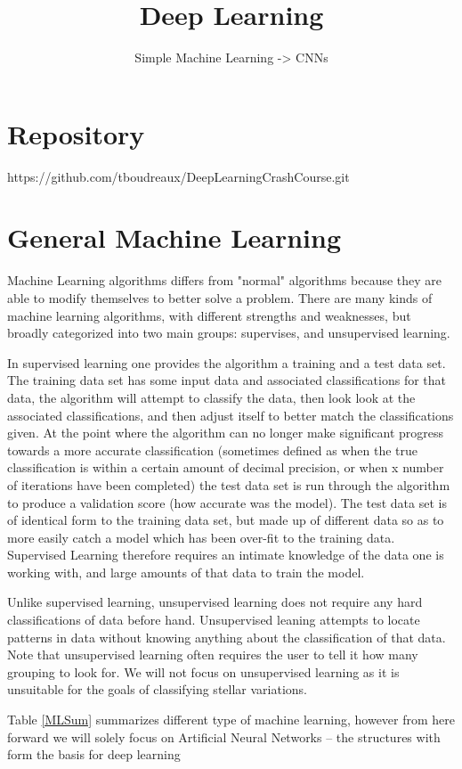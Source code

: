 \documentclass[a4paper]{article}
\title{Deep Learning}
\author{Simple Machine Learning -> CNNs }
\begin{document}
\maketitle
\section{Repository}
https://github.com/tboudreaux/DeepLearningCrashCourse.git
\section{General Machine Learning}
Machine Learning algorithms differs from "normal" algorithms because they are able to modify themselves to better solve a problem. There are many kinds of machine learning algorithms, with different strengths and weaknesses, but broadly categorized into two main groups: supervises, and unsupervised learning.

In supervised learning one provides the algorithm a training and a test data set. The training data set has some input data and associated classifications for that data, the algorithm will attempt to classify the data, then look look at the associated classifications, and then adjust itself to better match the classifications given. At the point where the algorithm can no longer make significant progress towards a more accurate classification (sometimes defined as when the true classification is within a certain amount of decimal precision, or when x number of iterations have been completed) the test data set is run through the algorithm to produce a validation score (how accurate was the model). The test data set is of identical form to the training data set, but made up of different data so as to more easily catch a model which has been over-fit to the training data. Supervised Learning therefore requires an intimate knowledge of the data one is working with, and large amounts of that data to train the model.

Unlike supervised learning, unsupervised learning does not require any hard classifications of data before hand. Unsupervised leaning attempts to locate patterns in data without knowing anything about the classification of that data. Note that unsupervised learning often requires the user to tell it how many grouping to look for. We will not focus on unsupervised learning as it is unsuitable for the goals of classifying stellar variations.

Table \ref{MLSum} summarizes different type of machine learning, however from here forward we will solely focus on Artificial Neural Networks -- the structures with form the basis for deep learning
\end{document}
